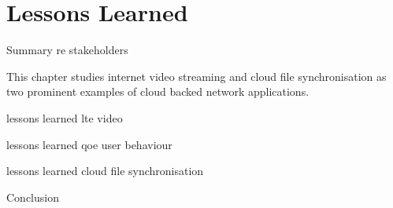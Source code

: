\section{Lessons Learned}\label{sec:application:lessons_learned}
Summary re stakeholders

This chapter studies internet video streaming and cloud file synchronisation as two prominent examples of cloud backed network applications.

lessons learned lte video

lessons learned qoe user behaviour

lessons learned cloud file synchronisation

Conclusion